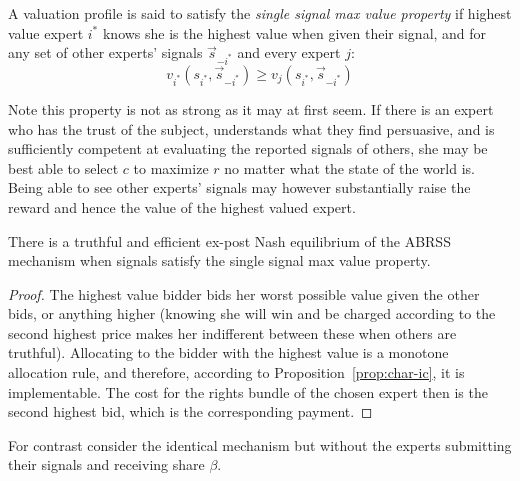 
\begin{defn}
	A valuation profile is said to satisfy the \emph{single signal max value property} if highest value expert $i^*$ knows she is the highest value when given their signal, and for any set of other experts' signals $\vec{s}_{-i^*}$ and every expert $j$: $$v_{i^*}(s_{i^*}, \vec{s}_{-i^*}) \geq  v_j(s_{i^*}, \vec{s}_{-i^*})$$
\end{defn}


Note this property is not as strong as it may at first seem. If there is an expert who has the trust of the subject, understands what they find persuasive, and is sufficiently competent at evaluating the reported signals of others, she may be best able to select $c$ to maximize $r$ no matter what the state of the world is. Being able to see other experts' signals may however substantially raise the reward and hence the value of the highest valued expert.  


\begin{thm}
	There is a truthful and efficient ex-post Nash equilibrium of the ABRSS mechanism when signals satisfy the single signal max value property.
\end{thm}

\begin{proof}
	The highest value bidder bids her worst possible value given the other bids, or anything higher (knowing she will win and be charged according to the second highest price makes her indifferent between these when others are truthful).
	Allocating to the bidder with the highest value is a monotone allocation rule, and therefore, according to Proposition~\ref{prop:char-ic}, it is implementable. The cost for the rights bundle of the chosen expert then is the second highest bid, which is the corresponding payment.
\end{proof}



For contrast consider the identical mechanism but without the experts submitting their signals and receiving share $\beta$. 
 
